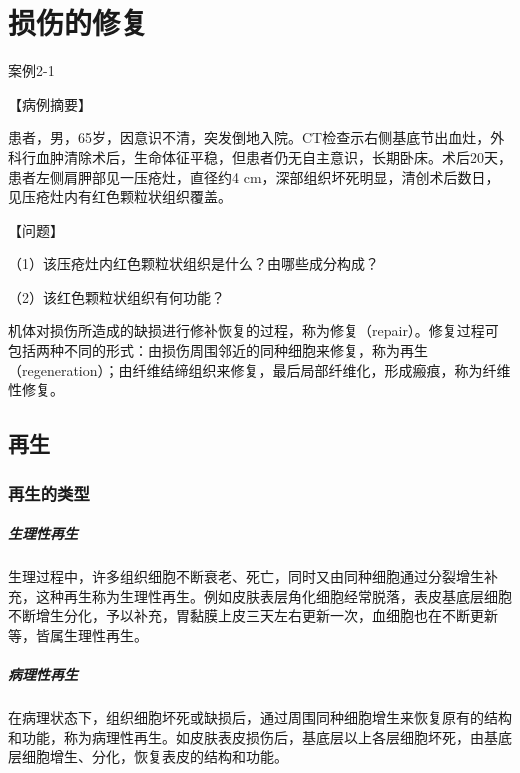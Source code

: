 \chapter{损伤的修复}

\begin{framed}
	{案例2-1}

	{【病例摘要】}

	患者，男，65岁，因意识不清，突发倒地入院。CT检查示右侧基底节出血灶，外科行血肿清除术后，生命体征平稳，但患者仍无自主意识，长期卧床。术后20天，患者左侧肩胛部见一压疮灶，直径约4
	cm，深部组织坏死明显，清创术后数日，见压疮灶内有红色颗粒状组织覆盖。

	{【问题】}

	（1）该压疮灶内红色颗粒状组织是什么？由哪些成分构成？

	（2）该红色颗粒状组织有何功能？
\end{framed}
机体对损伤所造成的缺损进行修补恢复的过程，称为修复（repair）。修复过程可包括两种不同的形式：由损伤周围邻近的同种细胞来修复，称为再生（regeneration）；由纤维结缔组织来修复，最后局部纤维化，形成瘢痕，称为纤维性修复。

\section{再生}

\subsection{再生的类型}

\paragraph{生理性再生}
生理过程中，许多组织细胞不断衰老、死亡，同时又由同种细胞通过分裂增生补充，这种再生称为生理性再生。例如皮肤表层角化细胞经常脱落，表皮基底层细胞不断增生分化，予以补充，胃黏膜上皮三天左右更新一次，血细胞也在不断更新等，皆属生理性再生。

\paragraph{病理性再生}
在病理状态下，组织细胞坏死或缺损后，通过周围同种细胞增生来恢复原有的结构和功能，称为病理性再生。如皮肤表皮损伤后，基底层以上各层细胞坏死，由基底层细胞增生、分化，恢复表皮的结构和功能。

